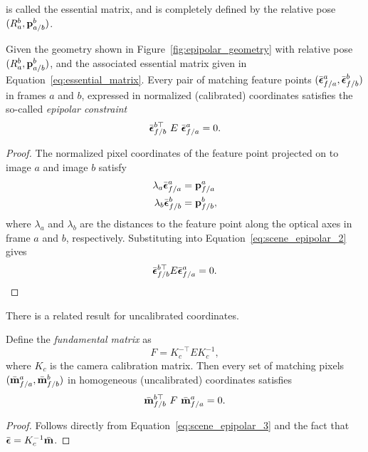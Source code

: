 is called the essential matrix, and is completely defined by the relative pose $(R_a^b, \mathbf{p}_{a/b}^b)$.  
\begin{theorem}
	Given the geometry shown in Figure~\ref{fig:epipolar_geometry} with relative pose $(R_a^b, \mathbf{p}_{a/b}^b)$, and the associated essential matrix given in Equation~\eqref{eq:essential_matrix}.  Every pair of matching feature points  $(\bar{\boldsymbol{\epsilon}}_{f/a}^a, \bar{\boldsymbol{\epsilon}}_{f/b}^b)$ in frames $a$ and $b$, expressed in normalized (calibrated) coordinates satisfies the so-called {\em epipolar constraint}
	\begin{equation}\label{eq:scene_epipolar_3}
	\bar{\epsilonbf}_{f/b}^{b\top} ~E~ \bar{\epsilonbf}_{f/a}^a = 0.
	\end{equation}
\end{theorem}
\begin{proof}
The normalized pixel coordinates of the feature point projected on to image $a$ and image $b$ satisfy
\begin{align*}
\lambda_a \bar{\boldsymbol{\epsilon}}_{f/a}^a &= \mathbf{p}_{f/a}^a \\
\lambda_b \bar{\boldsymbol{\epsilon}}_{f/b}^b &= \mathbf{p}_{f/b}^b,
\end{align*}
where $\lambda_a$ and $\lambda_b$ are the distances to the feature point along the optical axes in frame $a$ and $b$, respectively.  Substituting into Equation~\eqref{eq:scene_epipolar_2} gives
\begin{equation}\label{eq:scene_epipolar_3}
\bar{\epsilonbf}_{f/b}^{b\top} E \bar{\epsilonbf}_{f/a}^a = 0.
\end{equation}
\end{proof}

There is a related result for uncalibrated coordinates.
\begin{theorem}
	Define the {\em fundamental matrix} as
	\begin{equation}\label{eq:scene_fundamental_matrix}
	F = K_c^{-\top} E K_c^{-1},
	\end{equation}
	where $K_c$ is the camera calibration matrix.  Then every set of matching pixels $(\bar{\mathbf{m}}_{f/a}^a, \bar{\mathbf{m}}_{f/b}^b)$ in homogeneous (uncalibrated) coordinates satisfies
	\begin{equation}\label{eq:scene_epipolar_4}
	\bar{\mbf}_{f/b}^{b\top} ~F~ \bar{\mbf}_{f/a}^a = 0.
	\end{equation}
\end{theorem}
\begin{proof}
	Follows directly from Equation~\eqref{eq:scene_epipolar_3} and the fact that $\bar{\boldsymbol{\epsilon}} = K_c^{-1} \bar{\mathbf{m}}$.
\end{proof}

